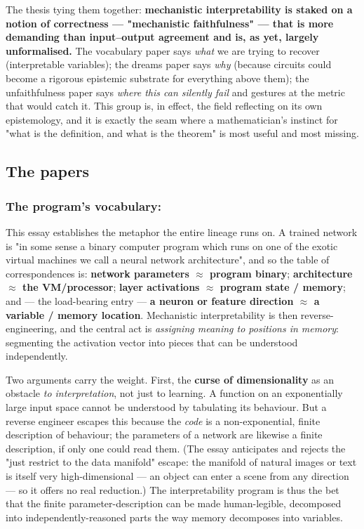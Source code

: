 The thesis tying them together: \textbf{mechanistic interpretability is staked on a notion of correctness --- "mechanistic faithfulness" --- that is more demanding than input--output agreement and is, as yet, largely unformalised.} The vocabulary paper says \emph{what} we are trying to recover (interpretable variables); the dreams paper says \emph{why} (because circuits could become a rigorous epistemic substrate for everything above them); the unfaithfulness paper says \emph{where this can silently fail} and gestures at the metric that would catch it. This group is, in effect, the field reflecting on its own epistemology, and it is exactly the seam where a mathematician's instinct for "what is the definition, and what is the theorem" is most useful and most missing.


\subsection*{The papers}

\subsubsection*{The program's vocabulary: \texorpdfstring{\textcite{mech-interp-variables-bases}}{Variables and bases}}

This essay establishes the metaphor the entire lineage runs on. A trained network is "in some sense a binary computer program which runs on one of the exotic virtual machines we call a neural network architecture", and so the table of correspondences is: \textbf{network parameters $\approx$ program binary}; \textbf{architecture $\approx$ the VM/processor}; \textbf{layer activations $\approx$ program state / memory}; and --- the load-bearing entry --- \textbf{a neuron or feature direction $\approx$ a variable / memory location}. Mechanistic interpretability is then reverse-engineering, and the central act is \emph{assigning meaning to positions in memory}: segmenting the activation vector into pieces that can be understood independently.

Two arguments carry the weight. First, the \textbf{curse of dimensionality} as an obstacle \emph{to interpretation}, not just to learning. A function on an exponentially large input space cannot be understood by tabulating its behaviour. But a reverse engineer escapes this because the \emph{code} is a non-exponential, finite description of behaviour; the parameters of a network are likewise a finite description, if only one could read them. (The essay anticipates and rejects the "just restrict to the data manifold" escape: the manifold of natural images or text is itself very high-dimensional --- an object can enter a scene from any direction --- so it offers no real reduction.) The interpretability program is thus the bet that the finite parameter-description can be made human-legible, decomposed into independently-reasoned parts the way memory decomposes into variables.

